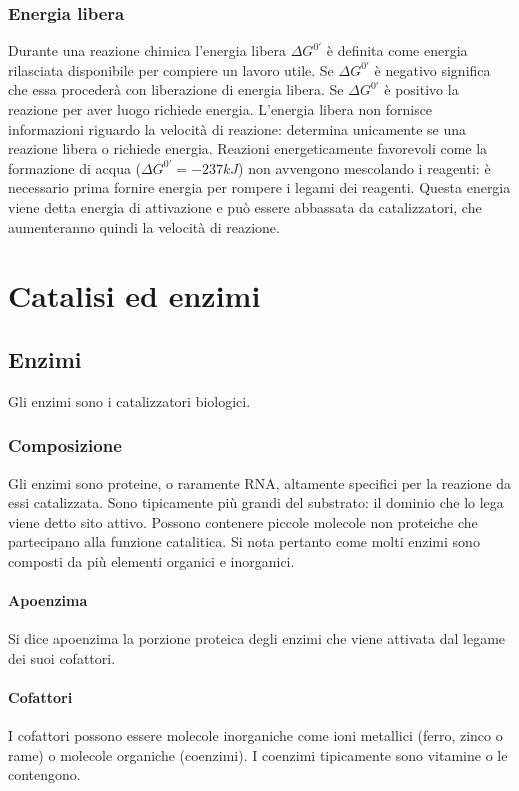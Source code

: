 		\subsubsection{Energia libera}
		Durante una reazione chimica l'energia libera $\Delta G^{0'}$ \`e definita come energia rilasciata disponibile per compiere un lavoro utile. 
		Se $\Delta G^{0'}$ \`e negativo significa che essa proceder\`a con liberazione di energia libera.
		Se $\Delta G^{0'}$ \`e positivo la reazione per aver luogo richiede energia.
		L'energia libera non fornisce informazioni riguardo la velocit\`a di reazione: determina unicamente se una reazione libera o richiede energia.
		Reazioni energeticamente favorevoli come la formazione di acqua ($\Delta G^{0'}=-237\si{kJ}$) non avvengono mescolando i reagenti: \`e necessario prima fornire energia per rompere i legami dei reagenti.
		Questa energia viene detta energia di attivazione e pu\`o essere abbassata da catalizzatori, che aumenteranno quindi la velocit\`a di reazione.

\section{Catalisi ed enzimi}

	\subsection{Enzimi}
	Gli enzimi sono i catalizzatori biologici. 
	
		\subsubsection{Composizione}
		Gli enzimi sono proteine, o raramente RNA, altamente specifici per la reazione da essi catalizzata.
		Sono tipicamente pi\`u grandi del substrato: il dominio che lo lega viene detto sito attivo.
		Possono contenere piccole molecole non proteiche che partecipano alla funzione catalitica.
		Si nota pertanto come molti enzimi sono composti da pi\`u elementi organici e inorganici.

			\paragraph{Apoenzima}
			Si dice apoenzima la porzione proteica degli enzimi che viene attivata dal legame dei suoi cofattori.

			\paragraph{Cofattori}
			I cofattori possono essere molecole inorganiche come ioni metallici (ferro, zinco o rame) o molecole organiche (coenzimi).
			I coenzimi tipicamente sono vitamine o le contengono.

